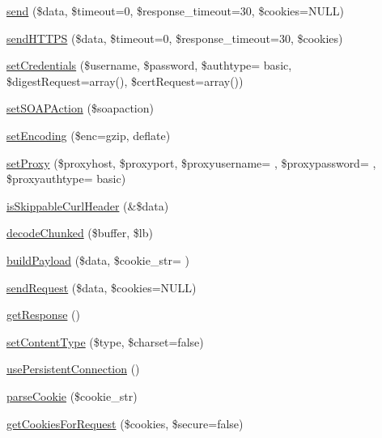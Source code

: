 \begin{DoxyCompactItemize}
\item 
\hyperlink{classsoap__transport__http_a124252f4e9d206d86fcd6522854eb919}{send} (\$data, \$timeout=0, \$response\+\_\+timeout=30, \$cookies=N\+U\+L\+L)
\item 
\hyperlink{classsoap__transport__http_aa93a72fdc90b3535f17d471b7ccc3ffd}{send\+H\+T\+T\+P\+S} (\$data, \$timeout=0, \$response\+\_\+timeout=30, \$cookies)
\item 
\hyperlink{classsoap__transport__http_afc1032cca5010f0fefba2f0d5a9c4520}{set\+Credentials} (\$username, \$password, \$authtype= \textquotesingle{}basic\textquotesingle{}, \$digest\+Request=array(), \$cert\+Request=array())
\item 
\hyperlink{classsoap__transport__http_a792db42ef189835b80389a838fbf2cef}{set\+S\+O\+A\+P\+Action} (\$soapaction)
\item 
\hyperlink{classsoap__transport__http_a9dde5d06442abd355db3acbde021121d}{set\+Encoding} (\$enc=\textquotesingle{}gzip, deflate\textquotesingle{})
\item 
\hyperlink{classsoap__transport__http_a2b6751afa15d43fd627f7689b2997702}{set\+Proxy} (\$proxyhost, \$proxyport, \$proxyusername= \textquotesingle{}\textquotesingle{}, \$proxypassword= \textquotesingle{}\textquotesingle{}, \$proxyauthtype= \textquotesingle{}basic\textquotesingle{})
\item 
\hyperlink{classsoap__transport__http_af7443369371a7caf67c04b09c6da774a}{is\+Skippable\+Curl\+Header} (\&\$data)
\item 
\hyperlink{classsoap__transport__http_a6dc9ad42ffb3aaea279c0ee16c4068b2}{decode\+Chunked} (\$buffer, \$lb)
\item 
\hyperlink{classsoap__transport__http_a3aaa5b45b7d75364bccaf3918a5ce908}{build\+Payload} (\$data, \$cookie\+\_\+str= \textquotesingle{}\textquotesingle{})
\item 
\hyperlink{classsoap__transport__http_a58f0210b24415cdc753d31b425a406be}{send\+Request} (\$data, \$cookies=N\+U\+L\+L)
\item 
\hyperlink{classsoap__transport__http_a6c907e8af775e517a77037dd0164222f}{get\+Response} ()
\item 
\hyperlink{classsoap__transport__http_a1d16955b48732c7b979b7d2ccaea34c8}{set\+Content\+Type} (\$type, \$charset=false)
\item 
\hyperlink{classsoap__transport__http_a8ae21fdc1993b8741956e86fc58c12b1}{use\+Persistent\+Connection} ()
\item 
\hyperlink{classsoap__transport__http_ae8e635ed6f4df1ef3f9329f1103b6941}{parse\+Cookie} (\$cookie\+\_\+str)
\item 
\hyperlink{classsoap__transport__http_a51e28e678d231bebb7de006262c31887}{get\+Cookies\+For\+Request} (\$cookies, \$secure=false)
\end{DoxyCompactItemize}
